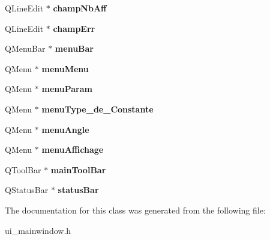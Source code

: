 \begin{DoxyCompactItemize}
\item 
\hypertarget{class_ui___main_window_a5ed8c322ed5b78af28d9810275a6b93c}{Q\-Line\-Edit $\ast$ {\bfseries champ\-Nb\-Aff}}\label{class_ui___main_window_a5ed8c322ed5b78af28d9810275a6b93c}

\item 
\hypertarget{class_ui___main_window_a21419cdc67fc93bad238bfccb1bdec9f}{Q\-Line\-Edit $\ast$ {\bfseries champ\-Err}}\label{class_ui___main_window_a21419cdc67fc93bad238bfccb1bdec9f}

\item 
\hypertarget{class_ui___main_window_a2be1c24ec9adfca18e1dcc951931457f}{Q\-Menu\-Bar $\ast$ {\bfseries menu\-Bar}}\label{class_ui___main_window_a2be1c24ec9adfca18e1dcc951931457f}

\item 
\hypertarget{class_ui___main_window_a6d7bbbef44e207ee15e5a623171033a2}{Q\-Menu $\ast$ {\bfseries menu\-Menu}}\label{class_ui___main_window_a6d7bbbef44e207ee15e5a623171033a2}

\item 
\hypertarget{class_ui___main_window_a620838edd0b215733f1ab0f0ec8af026}{Q\-Menu $\ast$ {\bfseries menu\-Param}}\label{class_ui___main_window_a620838edd0b215733f1ab0f0ec8af026}

\item 
\hypertarget{class_ui___main_window_a24c329f45c723c83d4fddebf105b3fc6}{Q\-Menu $\ast$ {\bfseries menu\-Type\-\_\-de\-\_\-\-Constante}}\label{class_ui___main_window_a24c329f45c723c83d4fddebf105b3fc6}

\item 
\hypertarget{class_ui___main_window_a345a4ec92e6309977909efe6600b45c1}{Q\-Menu $\ast$ {\bfseries menu\-Angle}}\label{class_ui___main_window_a345a4ec92e6309977909efe6600b45c1}

\item 
\hypertarget{class_ui___main_window_a90b7838eb41442b6dab6593fe61bbb58}{Q\-Menu $\ast$ {\bfseries menu\-Affichage}}\label{class_ui___main_window_a90b7838eb41442b6dab6593fe61bbb58}

\item 
\hypertarget{class_ui___main_window_a5172877001c8c7b4e0f6de50421867d1}{Q\-Tool\-Bar $\ast$ {\bfseries main\-Tool\-Bar}}\label{class_ui___main_window_a5172877001c8c7b4e0f6de50421867d1}

\item 
\hypertarget{class_ui___main_window_a50fa481337604bcc8bf68de18ab16ecd}{Q\-Status\-Bar $\ast$ {\bfseries status\-Bar}}\label{class_ui___main_window_a50fa481337604bcc8bf68de18ab16ecd}

\end{DoxyCompactItemize}


The documentation for this class was generated from the following file\-:\begin{DoxyCompactItemize}
\item 
ui\-\_\-mainwindow.\-h\end{DoxyCompactItemize}
